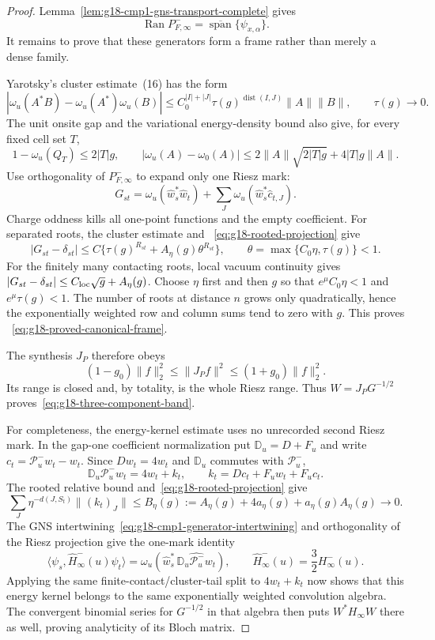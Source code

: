 \begin{proof}
 Lemma~\ref{lem:g18-cmp1-gns-transport-complete} gives
 \[
 \operatorname{Ran}P_{F,\infty}^-
 =\overline{\operatorname{span}}\{\psi_{x,\alpha}\}.
\]
It remains to prove that these generators form a frame rather than merely a
dense family.

Yarotsky's cluster estimate~(16) has the form
\[
 |\omega_u(A^*B)-\omega_u(A^*)\omega_u(B)|
 \le C_0^{|I|+|J|}\tau(g)^{\operatorname{dist}(I,J)}
       \|A\|\|B\|,\qquad \tau(g)\to0 .
\]
The unit onsite gap and the variational energy-density bound also give, for
every fixed cell set $T$,
\[
 1-\omega_u(Q_T)\le2|T|g,\qquad
 |\omega_u(A)-\omega_0(A)|
 \le2\|A\|\sqrt{2|T|g}+4|T|g\|A\|.
\]
Use orthogonality of $P_{F,\infty}^-$ to expand only one Riesz mark:
\[
 G_{st}
 =\omega_u(\widehat w_s^*\widehat w_t)
  +\sum_J\omega_u(\widehat w_s^*\widehat c_{t,J}).
\]
Charge oddness kills all one-point functions and the empty coefficient.
For separated roots, the cluster estimate and
~\eqref{eq:g18-rooted-projection} give
\[
 |G_{st}-\delta_{st}|
 \le C\{\tau(g)^{R_{st}}+
 A_\eta(g)\theta^{R_{st}}\},
 \qquad \theta=\max\{C_0\eta,\tau(g)\}<1 .
\]
For the finitely many contacting roots, local vacuum continuity gives
$|G_{st}-\delta_{st}|\le C_{\rm loc}\sqrt g+A_\eta(g)$.
Choose $\eta$ first and then $g$ so that
$e^\mu C_0\eta<1$ and $e^\mu\tau(g)<1$.  The number of roots at distance
$n$ grows only quadratically, hence the exponentially weighted row and
column sums tend to zero with $g$.  This proves
~\eqref{eq:g18-proved-canonical-frame}.

The synthesis $J_P$ therefore obeys
\[
 (1-g_0)\|f\|_2^2\le\|J_Pf\|^2\le(1+g_0)\|f\|_2^2.
\]
Its range is closed and, by totality, is the whole Riesz range.  Thus
$W=J_PG^{-1/2}$ proves~\eqref{eq:g18-three-component-band}.

For completeness, the energy-kernel estimate uses no unrecorded second Riesz
mark.  In the gap-one coefficient normalization put
$\mathbb D_u=D+F_u$ and write $c_t=\mathcal P_u^-w_t-w_t$.  Since
$Dw_t=4w_t$ and $\mathbb D_u$ commutes with $\mathcal P_u^-$,
\[
 \mathbb D_u\mathcal P_u^-w_t=4w_t+k_t,
 \qquad k_t=Dc_t+F_uw_t+F_uc_t .
\]
The rooted relative bound and~\eqref{eq:g18-rooted-projection} give
\[
 \sum_J\eta^{-d(J,S_t)}\|(k_t)_J\|
 \le B_\eta(g):=A_\eta(g)+4a_\eta(g)
                  +a_\eta(g)A_\eta(g)\longrightarrow0 .
\]
The GNS intertwining~\eqref{eq:g18-cmp1-generator-intertwining} and
orthogonality of the Riesz projection give the one-mark identity
\[
 \bigl\langle\psi_s,\widehat H_\infty^-(u)\psi_t\bigr\rangle
 =\omega_u\!\left(\widehat w_s^*\,
        \widehat{\mathbb D_u\mathcal P_u^-w_t}\right),
 \qquad \widehat H_\infty^-(u)=\frac32H_\infty^-(u).
\]
Applying the same finite-contact/cluster-tail split to $4w_t+k_t$ now shows
that this energy kernel belongs to the same exponentially weighted
convolution algebra.  The convergent binomial series for $G^{-1/2}$ in that
algebra then puts $W^*H_\infty W$ there as well, proving analyticity of its
Bloch matrix.


\end{proof}
